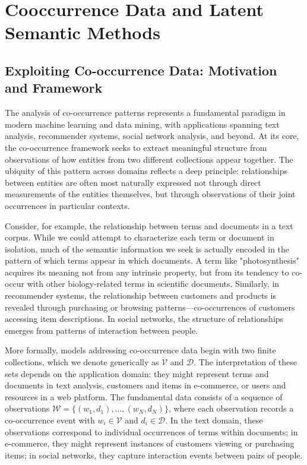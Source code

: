 \chapter{Cooccurrence Data and Latent Semantic Methods}

\section*{Exploiting Co-occurrence Data: Motivation and Framework}

The analysis of co-occurrence patterns represents a fundamental paradigm in modern machine learning and data mining, with applications spanning text analysis, recommender systems, social network analysis, and beyond. At its core, the co-occurrence framework seeks to extract meaningful structure from observations of how entities from two different collections appear together. The ubiquity of this pattern across domains reflects a deep principle: relationships between entities are often most naturally expressed not through direct measurements of the entities themselves, but through observations of their joint occurrences in particular contexts.

Consider, for example, the relationship between terms and documents in a text corpus. While we could attempt to characterize each term or document in isolation, much of the semantic information we seek is actually encoded in the pattern of which terms appear in which documents. A term like "photosynthesis" acquires its meaning not from any intrinsic property, but from its tendency to co-occur with other biology-related terms in scientific documents. Similarly, in recommender systems, the relationship between customers and products is revealed through purchasing or browsing patterns—co-occurrences of customers accessing item descriptions. In social networks, the structure of relationships emerges from patterns of interaction between people.

More formally, models addressing co-occurrence data begin with two finite collections, which we denote generically as $\mathcal{V}$ and $\mathcal{D}$. The interpretation of these sets depends on the application domain: they might represent terms and documents in text analysis, customers and items in e-commerce, or users and resources in a web platform. The fundamental data consists of a sequence of observations $\mathcal{W} = \{(w_1, d_1), \ldots, (w_N, d_N)\}$, where each observation records a co-occurrence event with $w_i \in \mathcal{V}$ and $d_i \in \mathcal{D}$. In the text domain, these observations correspond to individual occurrences of terms within documents; in e-commerce, they might represent instances of customers viewing or purchasing items; in social networks, they capture interaction events between pairs of people.

